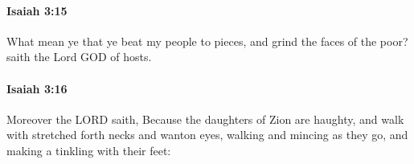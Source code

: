 		\paragraph{Isaiah 3:15} %
			\label{ISAIAH-3-15}

			What mean ye that ye beat my people to pieces, and grind the faces of the poor? saith the Lord GOD of hosts.


		\paragraph{Isaiah 3:16} %
			\label{ISAIAH-3-16}

			Moreover the LORD saith, Because the daughters of Zion are haughty, and walk with stretched forth necks and wanton eyes, walking and mincing as they go, and making a tinkling with their feet:


